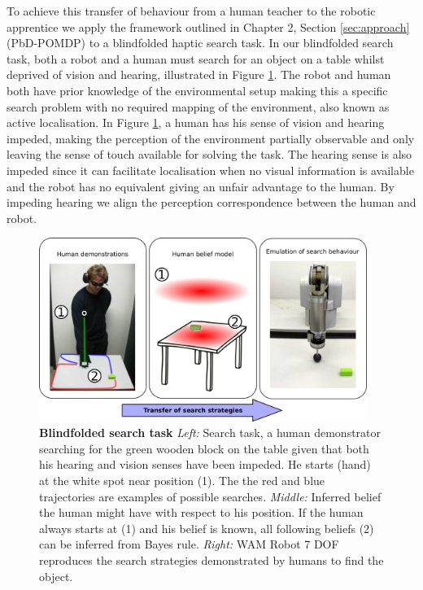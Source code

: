 To achieve this transfer of behaviour from a human teacher to the robotic apprentice we apply the framework outlined in Chapter 2, 
Section \ref{sec:approach} (PbD-POMDP) to a blindfolded haptic search task. In our blindfolded search task, both a robot and a human must search for an object on a table whilst deprived 
of vision and hearing, illustrated in Figure \ref{fig:searching}. The robot and human both have prior knowledge of the environmental 
setup making this a specific search problem with no required mapping of the environment, also known as active localisation. 
In Figure \ref{fig:searching}, a human has his sense of vision and hearing impeded, making the perception of the environment partially observable and 
only leaving the sense of touch available for solving the task. The hearing sense is also impeded since it can 
facilitate localisation when no visual information is available and the robot has no equivalent giving an unfair 
advantage to the human. By impeding hearing we align the perception correspondence between the human and robot.

\begin{figure}[h]
  \centering
  \includegraphics[width=0.95\textwidth]{./ch3-Search/Figures/Figure1.pdf}
  \caption{\textbf{Blindfolded search task} \textit{Left:}  Search task, a human demonstrator searching for the green wooden block on the table given
  that both his hearing and vision senses have been impeded. He starts (hand) at the white spot near position (1). The the red and blue trajectories 
  are examples of possible searches.
  \textit{Middle:} Inferred belief the human might have with respect to his position. If the human always starts at (1) and his belief is known, all 
  following beliefs (2) can be inferred from Bayes rule. \textit{Right:} WAM Robot 7 DOF
  reproduces the search strategies demonstrated by humans to find the object.}
 \label{fig:searching}
\end{figure} 

